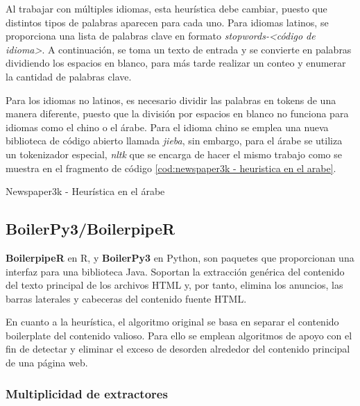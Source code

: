 Al trabajar con múltiples idiomas, esta heurística debe cambiar, puesto que distintos tipos de palabras
aparecen para cada uno. Para idiomas latinos, se proporciona una lista de palabras clave en formato 
\emph{stopwords-<código de idioma>}. A continuación, se toma un texto de entrada y se convierte en palabras 
dividiendo los espacios en blanco, para más tarde realizar un conteo y enumerar la cantidad de palabras 
clave.

Para los idiomas no latinos, es necesario dividir las palabras en tokens de una manera diferente, puesto
que la división por espacios en blanco no funciona para idiomas como el chino o el árabe. Para el idioma
chino se emplea una nueva biblioteca de código abierto llamada \emph{jieba}, sin embargo, para el árabe
se utiliza un tokenizador especial, \emph{nltk} que se encarga de hacer el mismo trabajo como se muestra 
en el fragmento de código \ref{cod:newspaper3k - heuristica en el arabe}.

\begin{codefloat}
  
  \caption{Newspaper3k - Heurística en el árabe}
  \label{cod:newspaper3k - heuristica en el arabe}
\end{codefloat}

\subsection{BoilerPy3/BoilerpipeR}
\label{subsec:boilerpy/boilerpiper}

\textbf{BoilerpipeR} \cite{boilerpipeR-cran} en R, y \textbf{BoilerPy3} \cite{boilerpy} en Python, son 
paquetes que proporcionan una interfaz para una biblioteca Java. Soportan la extracción genérica del 
contenido del texto principal de los archivos HTML y, por tanto, elimina los anuncios, las barras laterales 
y cabeceras del contenido fuente HTML.

En cuanto a la heurística, el algoritmo original se basa en separar el contenido boilerplate del contenido
valioso. Para ello se emplean algoritmos de apoyo con el fin de detectar y eliminar el exceso de desorden
alrededor del contenido principal de una página web.

\subsubsection{Multiplicidad de extractores}
\label{subsubsec:multiplicidad de extractores}

